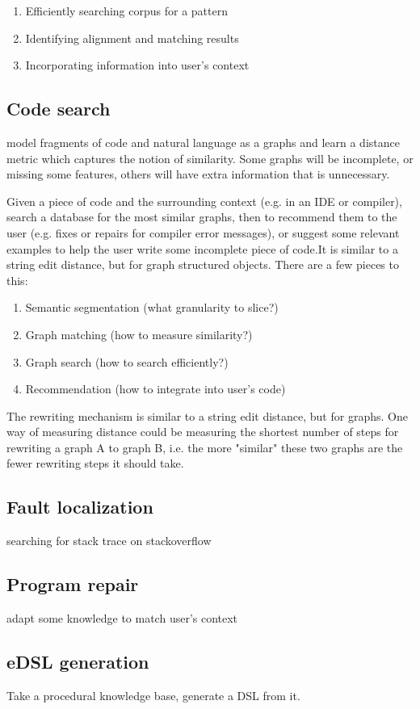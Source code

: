 \documentclass[11pt]{article}
\begin{document}
    \begin{enumerate}
        \item Efficiently searching corpus for a pattern
        \item Identifying alignment and matching results
        \item Incorporating information into user's context
    \end{enumerate}

    \subsection{Code search}

    model fragments of code and natural language as a graphs and learn a distance metric which captures the notion of similarity. Some graphs will be incomplete, or missing some features, others will have extra information that is unnecessary.

    Given a piece of code and the surrounding context (e.g. in an IDE or compiler), search a database for the most similar graphs, then to recommend them to the user (e.g. fixes or repairs for compiler error messages), or suggest some relevant examples to help the user write some incomplete piece of code.It is similar to a string edit distance, but for graph structured objects. There are a few pieces to this:

    \begin{enumerate}
        \item Semantic segmentation (what granularity to slice?)
        \item Graph matching (how to measure similarity?)
        \item Graph search (how to search efficiently?)
        \item Recommendation (how to integrate into user's code)
    \end{enumerate}

    The rewriting mechanism is similar to a string edit distance, but for graphs. One way of measuring distance could be measuring the shortest number of steps for rewriting a graph A to graph B, i.e. the more "similar" these two graphs are the fewer rewriting steps it should take.

    \subsection{Fault localization}

    searching for stack trace on stackoverflow

    \subsection{Program repair}

    adapt some knowledge to match user's context

    \subsection{eDSL generation}

    Take a procedural knowledge base, generate a DSL from it.

    \pagebreak
    
    
\end{document}
